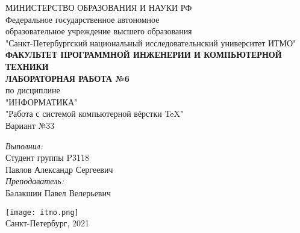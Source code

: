 

\begin{center}
\large{
	МИНИСТЕРСТВО ОБРАЗОВАНИЯ И НАУКИ РФ\\
\vspace{1em}
	Федеральное государственное автономное\\
	образовательное учреждение высшего образования\\
"Санкт-Петербургский национальный исследовательнский университет ИТМО"
\\ \vspace{1em}
\textbf{ФАКУЛЬТЕТ ПРОГРАММНОЙ ИНЖЕНЕРИИ И КОМПЬЮТЕРНОЙ ТЕХНИКИ}\\
\vspace{10em}
\textbf{ЛАБОРАТОРНАЯ РАБОТА №6}\\
по дисциплине\\
"ИНФОРМАТИКА"\\
"Работа с системой
компьютерной вёрстки \TeX"\\
\vspace{1em}
Вариант №33\\
\vspace{18em}
	\begin{flushright}
	\textit{Выполнил:}\\
	Студент группы P3118\\
	Павлов Александр Сергеевич\\
	\textit{Преподаватель:}\\
	Балакшин Павел Велерьевич\\
	\end{flushright}
\vspace{2em}
\texttt{[image: itmo.png]}\\
Санкт-Петербург, 2021
}
\end{center}
